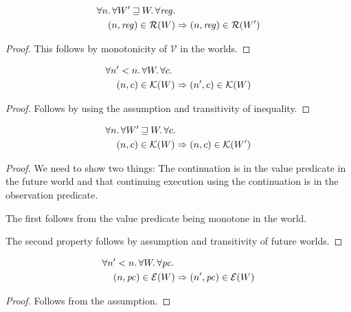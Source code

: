 \documentclass{article}
\newcommand{\var}[1]{\mathit{#1}}
\newcommand{\pc}{\mathit{pc}}
\newcommand{\reg}{\var{reg}}
\newcommand{\future}{\mathbin{\sqsupseteq}}
\newcommand{\asmType}{\plaindom{AsmType}}
\newcommand{\plaindom}[1]{\mathrm{#1}}
\newcommand{\intr}[2]{\mathcal{#1}}
\newcommand{\valueintr}[1]{\intr{V}{#1}}
\newcommand{\exprintr}[1]{\intr{E}{#1}}
\newcommand{\contintr}[1]{\intr{K}{#1}}
\newcommand{\regintr}[1]{\intr{R}{#1}}
\newcommand{\stdvr}{\valueintr{\asmType}}
\newcommand{\stder}{\exprintr{\asmType}}
\newcommand{\stdrr}{\regintr{\asmType}}
\newcommand{\stdkr}{\contintr{\asmType}}
\newcommand{\npair}[2][n]{\left(#1,#2 \right)}
\begin{document}
\begin{lemma}
  \begin{align*}
    &\forall n \ldotp \forall W' \future W \ldotp \forall \reg \ldotp\\
    &\quad \npair{\reg} \in \stdrr(W) \Rightarrow \npair{\reg} \in \stdrr(W')
  \end{align*}
\end{lemma}
\begin{proof}
  This follows by monotonicity of $\stdvr$ in the worlds.
\end{proof}

\begin{lemma}
  \begin{align*}
    &\forall n' < n \ldotp \forall W \ldotp \forall c \ldotp\\
    &\quad \npair{c} \in \stdkr(W) \Rightarrow \npair[n']{c} \in \stdkr(W)
  \end{align*}
\end{lemma}
\begin{proof}
Follows by using the assumption and transitivity of inequality.
\end{proof}

\begin{lemma}
  \begin{align*}
    &\forall n \ldotp \forall W' \future W \ldotp \forall c \ldotp\\
    &\quad \npair{c} \in \stdkr(W) \Rightarrow \npair{c} \in \stdkr(W')
  \end{align*}
\end{lemma}
\begin{proof}
We need to show two things: The continuation is in the value predicate in the future world and that continuing execution using the continuation is in the observation predicate.

The first follows from the value predicate being monotone in the world.

The second property follows by assumption and transitivity of future worlds.
\end{proof}

\begin{lemma}
\label{lem:stder-mon-step}
  \begin{align*}
    & \forall n' < n \ldotp \forall W \ldotp \forall \pc \ldotp\\
    & \quad \npair{\pc} \in \stder(W) \Rightarrow \npair[n']{\pc} \in \stder(W)
  \end{align*}
\end{lemma}
\begin{proof}
  Follows from the assumption.
\end{proof}
\end{document}
